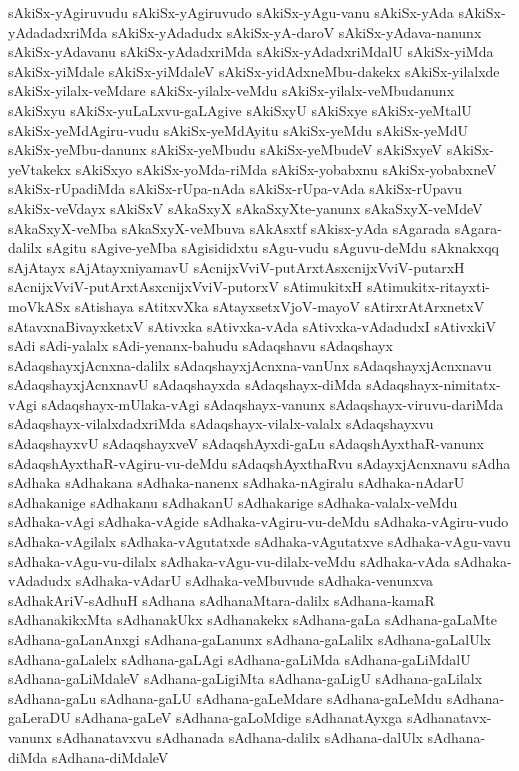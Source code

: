 {sAkiSx-yAgiruvudu
sAkiSx-yAgiruvudo
sAkiSx-yAgu-vanu
sAkiSx-yAda
sAkiSx-yAdadadxriMda
sAkiSx-yAdadudx
sAkiSx-yA-daroV
sAkiSx-yAdava-nanunx
sAkiSx-yAdavanu
sAkiSx-yAdadxriMda
sAkiSx-yAdadxriMdalU
sAkiSx-yiMda
sAkiSx-yiMdale
sAkiSx-yiMdaleV
sAkiSx-yidAdxneMbu-dakekx
sAkiSx-yilalxde
sAkiSx-yilalx-veMdare
sAkiSx-yilalx-veMdu
sAkiSx-yilalx-veMbudanunx
sAkiSxyu
sAkiSx-yuLaLxvu-gaLAgive
sAkiSxyU
sAkiSxye
sAkiSx-yeMtalU
sAkiSx-yeMdAgiru-vudu
sAkiSx-yeMdAyitu
sAkiSx-yeMdu
sAkiSx-yeMdU
sAkiSx-yeMbu-danunx
sAkiSx-yeMbudu
sAkiSx-yeMbudeV
sAkiSxyeV
sAkiSx-yeVtakekx
sAkiSxyo
sAkiSx-yoMda-riMda
sAkiSx-yobabxnu
sAkiSx-yobabxneV
sAkiSx-rUpadiMda
sAkiSx-rUpa-nAda
sAkiSx-rUpa-vAda
sAkiSx-rUpavu
sAkiSx-veVdayx
sAkiSxV
sAkaSxyX
sAkaSxyXte-yanunx
sAkaSxyX-veMdeV
sAkaSxyX-veMba
sAkaSxyX-veMbuva
sAkAsxtf
sAkisx-yAda
sAgarada
sAgara-dalilx
sAgitu
sAgive-yeMba
sAgisididxtu
sAgu-vudu
sAguvu-deMdu
sAknakxqq
sAjAtayx
sAjAtayxniyamavU
sAcnijxVviV-putArxtAsxcnijxVviV-putarxH
sAcnijxVviV-putArxtAsxcnijxVviV-putorxV
sAtimukitxH
sAtimukitx-ritayxti-moVkASx
sAtishaya
sAtitxvXka
sAtayxsetxVjoV-mayoV
sAtirxrAtArxnetxV
sAtavxnaBivayxketxV
sAtivxka
sAtivxka-vAda
sAtivxka-vAdadudxI
sAtivxkiV
sAdi
sAdi-yalalx
sAdi-yenanx-bahudu
sAdaqshavu
sAdaqshayx
sAdaqshayxjAcnxna-dalilx
sAdaqshayxjAcnxna-vanUnx
sAdaqshayxjAcnxnavu
sAdaqshayxjAcnxnavU
sAdaqshayxda
sAdaqshayx-diMda
sAdaqshayx-nimitatx-vAgi
sAdaqshayx-mUlaka-vAgi
sAdaqshayx-vanunx
sAdaqshayx-viruvu-dariMda
sAdaqshayx-vilalxdadxriMda
sAdaqshayx-vilalx-valalx
sAdaqshayxvu
sAdaqshayxvU
sAdaqshayxveV
sAdaqshAyxdi-gaLu
sAdaqshAyxthaR-vanunx
sAdaqshAyxthaR-vAgiru-vu-deMdu
sAdaqshAyxthaRvu
sAdayxjAcnxnavu
sAdha
sAdhaka
sAdhakana
sAdhaka-nanenx
sAdhaka-nAgiralu
sAdhaka-nAdarU
sAdhakanige
sAdhakanu
sAdhakanU
sAdhakarige
sAdhaka-valalx-veMdu
sAdhaka-vAgi
sAdhaka-vAgide
sAdhaka-vAgiru-vu-deMdu
sAdhaka-vAgiru-vudo
sAdhaka-vAgilalx
sAdhaka-vAgutatxde
sAdhaka-vAgutatxve
sAdhaka-vAgu-vavu
sAdhaka-vAgu-vu-dilalx
sAdhaka-vAgu-vu-dilalx-veMdu
sAdhaka-vAda
sAdhaka-vAdadudx
sAdhaka-vAdarU
sAdhaka-veMbuvude
sAdhaka-venunxva
sAdhakAriV-sAdhuH
sAdhana
sAdhanaMtara-dalilx
sAdhana-kamaR
sAdhanakikxMta
sAdhanakUkx
sAdhanakekx
sAdhana-gaLa
sAdhana-gaLaMte
sAdhana-gaLanAnxgi
sAdhana-gaLanunx
sAdhana-gaLalilx
sAdhana-gaLalUlx
sAdhana-gaLalelx
sAdhana-gaLAgi
sAdhana-gaLiMda
sAdhana-gaLiMdalU
sAdhana-gaLiMdaleV
sAdhana-gaLigiMta
sAdhana-gaLigU
sAdhana-gaLilalx
sAdhana-gaLu
sAdhana-gaLU
sAdhana-gaLeMdare
sAdhana-gaLeMdu
sAdhana-gaLeraDU
sAdhana-gaLeV
sAdhana-gaLoMdige
sAdhanatAyxga
sAdhanatavx-vanunx
sAdhanatavxvu
sAdhanada
sAdhana-dalilx
sAdhana-dalUlx
sAdhana-diMda
sAdhana-diMdaleV
}
